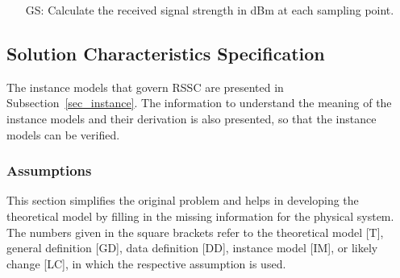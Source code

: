 \documentclass[12pt]{article}
\newcounter{goalnum} %
\begin{document}
\begin{itemize}

\item[GS\refstepcounter{goalnum}\thegoalnum \label{goalRSS}:] Calculate
the received signal strength in dBm at each sampling point.

\end{itemize}

\subsection{Solution Characteristics Specification}

The instance models that govern RSSC are presented in
Subsection~\ref{sec_instance}.  The information to understand the meaning of the
instance models and their derivation is also presented, so that the instance
models can be verified.

\subsubsection{Assumptions} \label{sec_assumpt}

This section simplifies the original problem and helps in developing the
theoretical model by filling in the missing information for the physical
system. The numbers given in the square brackets refer to the theoretical model
[T], general definition [GD], data definition [DD], instance model [IM], or
likely change [LC], in which the respective assumption is used.
\end{document}
